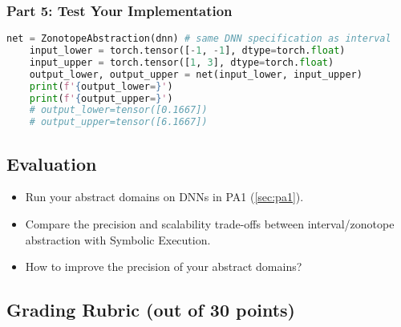\subsubsection{Part 5: Test Your Implementation}


\begin{lstlisting}[language=Python]
    net = ZonotopeAbstraction(dnn) # same DNN specification as interval
    input_lower = torch.tensor([-1, -1], dtype=torch.float)
    input_upper = torch.tensor([1, 3], dtype=torch.float)
    output_lower, output_upper = net(input_lower, input_upper)
    print(f'{output_lower=}')
    print(f'{output_upper=}')
    # output_lower=tensor([0.1667])
    # output_upper=tensor([6.1667])
\end{lstlisting}



\subsection{Evaluation}

\begin{itemize}
    \item Run your abstract domains on DNNs in PA1 (\autoref{sec:pa1}).
    \item Compare the precision and scalability trade-offs between interval/zonotope abstraction with Symbolic Execution.
    \item How to improve the precision of your abstract domains?
\end{itemize}

\subsection{Grading Rubric (out of 30 points)}

